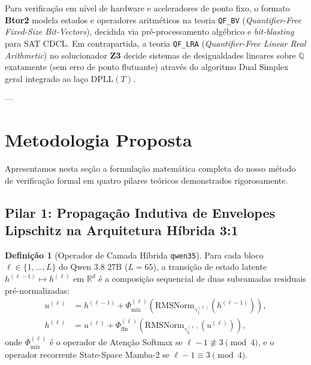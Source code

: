 \documentclass[11pt,a4paper]{article}
\theoremstyle{definition}
\newtheorem{definition}{Definição}
\begin{document}
Para verificação em nível de hardware e aceleradores de ponto fixo, o formato \textbf{Btor2} \cite{niemetz2018} modela estados e operadores aritméticos na teoria \texttt{QF\_BV} (\textit{Quantifier-Free Fixed-Size Bit-Vectors}), decidida via pré-processamento algébrico e \textit{bit-blasting} para SAT CDCL. Em contrapartida, a teoria \texttt{QF\_LRA} (\textit{Quantifier-Free Linear Real Arithmetic}) no solucionador \textbf{Z3} \cite{demoura2008} decide sistemas de desigualdades lineares sobre $\mathbb{Q}$ exatamente (sem erro de ponto flutuante) através do algoritmo Dual Simplex geral integrado ao laço $\text{DPLL}(T)$.

---

\section{Metodologia Proposta}

Apresentamos nesta seção a formulação matemática completa do nosso método de verificação formal em quatro pilares teóricos demonstrados rigorosamente.

\subsection{Pilar 1: Propagação Indutiva de Envelopes Lipschitz na Arquitetura Híbrida 3:1}

\begin{definition}[Operador de Camada Híbrida \texttt{qwen35}]
Para cada bloco $\ell \in \{1, \dots, L\}$ do Qwen 3.8 27B ($L=65$), a transição de estado latente $h^{(\ell-1)} \mapsto h^{(\ell)}$ em $\mathbb{R}^d$ é a composição sequencial de duas subcamadas residuais pré-normalizadas:
\begin{align}
    u^{(\ell)} &= h^{(\ell-1)} + \Phi_{\text{mix}}^{(\ell)}\!\left(\text{RMSNorm}_{\gamma_1^{(\ell)}}(h^{(\ell-1)})\right), \label{eq:qwen_mix} \\
    h^{(\ell)} &= u^{(\ell)} + \Phi_{\text{ffn}}^{(\ell)}\!\left(\text{RMSNorm}_{\gamma_2^{(\ell)}}(u^{(\ell)})\right), \label{eq:qwen_ffn}
\end{align}
onde $\Phi_{\text{mix}}^{(\ell)}$ é o operador de Atenção Softmax se $\ell - 1 \not\equiv 3 \pmod 4$, e o operador recorrente State-Space Mamba-2 se $\ell - 1 \equiv 3 \pmod 4$.
\end{definition}
\end{document}
